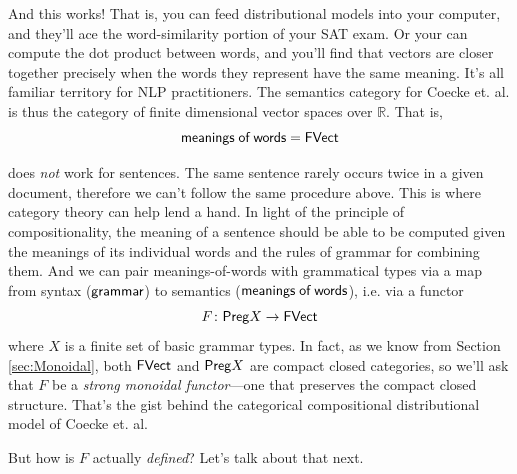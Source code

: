 \documentclass{tufte-handout-tai}
\newcommand{\cat}[1]{{\normalfont\textsf{#1}}}
\theoremstyle{plain}
\theoremstyle{definition}
\theoremstyle{remark}
\begin{document}
And this works! That is, you can feed distributional models into your computer, and they'll ace the word-similarity portion of your SAT exam. Or your can compute the dot product between words, and you'll find that vectors are closer together precisely when the words they represent have the same meaning. It's all familiar territory for NLP practitioners. The semantics category for Coecke et. al. is thus the category of finite dimensional vector spaces over $\mathbb{R}$. That is,
\[\cat{meanings\;of\;words} = \cat{FVect}\]



 does \textit{not} work for sentences. The same sentence rarely occurs twice in a given document, therefore we can't follow the same procedure above. This is where category theory can help lend a hand. In light of the principle of compositionality, the meaning of a sentence should be able to be computed given the meanings of its individual words and the rules of grammar for combining them. And we can pair meanings-of-words with grammatical types via a map from syntax ($\cat{grammar}$) to semantics ($\cat{meanings\;of\;words}$), i.e. via a functor
\[F\colon \cat{Preg}X\to\cat{FVect}\]
where $X$ is a finite set of basic grammar types. In fact, as we know from Section \ref{sec:Monoidal}, both $\cat{FVect}$ and $\cat{Preg}X$ are compact closed categories, so we'll ask that $F$ be a \textit{strong monoidal functor}---one that preserves the compact closed structure. That's the gist behind the categorical compositional distributional model of Coecke et. al.

\vspace{0.4cm}
\noindent But how is $F$ actually \textit{defined}? Let's talk about that next.





\end{document}
